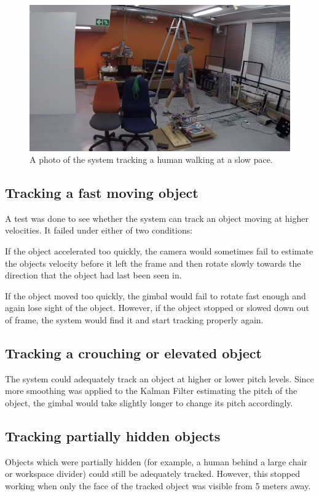 \begin{figure}[h!]
  \centering
  \includegraphics[width=\textwidth]{results/follow_walk_small_delay}
  \caption{\label{fig:follow_walk_small_delay}A photo of the system tracking a human walking at a slow pace.}
\end{figure}

\subsection{Tracking a fast moving object}
A test was done to see whether the system can track an object moving at higher velocities. It failed under either of two conditions:

If the object accelerated too quickly, the camera would sometimes fail to estimate the objects velocity before it left the frame and then rotate slowly towards the direction that the object had last been seen in.

If the object moved too quickly, the gimbal would fail to rotate fast enough and again lose sight of the object. However, if the object stopped or slowed down out of frame, the system would find it and start tracking properly again.


\subsection{Tracking a crouching or elevated object}
The system could adequately track an object at higher or lower pitch levels. Since more smoothing was applied to the Kalman Filter estimating the pitch of the object, the gimbal would take slightly longer to change its pitch accordingly.


\subsection{Tracking partially hidden objects}
Objects which were partially hidden (for example, a human behind a large chair or workspace divider) could still be adequately tracked. However, this stopped working when only the face of the tracked object was visible from 5 meters away.


